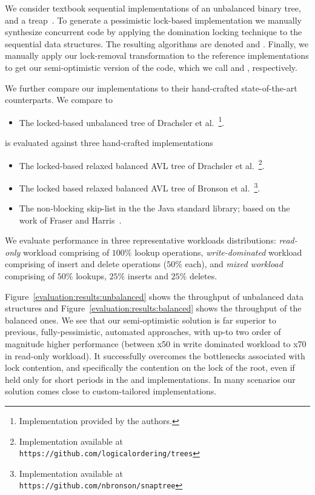 We consider textbook sequential implementations of an unbalanced binary
tree, and a treap~\cite{AragonS1989}. To
generate a pessimistic lock-based implementation we manually synthesize
concurrent code by applying the domination locking technique to the sequential
data structures. The resulting algorithms are denoted \domTree and \domTreap.
Finally, we manually apply our lock-removal transformation to the reference
implementations to get our semi-optimistic version of the code, which we call
\autoTree and \autoTreap, respectively.     

We further compare our implementations to their hand-crafted state-of-the-art counterparts. We compare \autoTree to
\begin{itemize}
\item \danaTree The locked-based 
				unbalanced tree of Drachsler et
				al.~\cite{DrachslerVY2014}\footnote{Implementation provided by the authors.}.
\end{itemize}
\autoTreap is evaluated against three hand-crafted implementations
\begin{itemize}
\item \danaAVL The locked-based relaxed balanced AVL tree of 
				Drachsler et al.~\cite{DrachslerVY2014}\footnote{Implementation available at \\
				\texttt{https://github.com/logicalordering/trees}}.
\item \bronson The locked based relaxed balanced AVL tree
				of Bronson et al.~\cite{BronsonCCO2010}\footnote{Implementation available at \\
				\texttt{https://github.com/nbronson/snaptree}}.
\item \skiplist The non-blocking skip-list in the 
				the Java standard library; based on the work of
				Fraser and Harris~\cite{fraser2004practical}.
\end{itemize}

We evaluate performance in three representative workloads distributions:
\emph{read-only} workload comprising of $100\%$ lookup operations, \emph{write-dominated}
workload comprising of insert and delete operations ($50\%$ each), and
\emph{mixed workload} comprising of $50\%$ lookups, $25\%$ inserts and $25\%$
deletes.

Figure~\ref{evaluation:results:unbalanced} 
shows the throughput of unbalanced data structures and Figure~\ref{evaluation:results:balanced} shows
the throughput of the balanced ones. We see that our semi-optimistic
solution is far superior to previous, fully-pessimistic, 
automated approaches, with up-to two order of magnitude higher performance
(between x50 in write dominated workload to x70 in read-only workload). It
successfully overcomes the bottlenecks associated with lock contention, and 
specifically the contention on the lock of the root, even if held only for short
periods in the \domTree and \domTreap implementations. In
many scenarios our solution comes close to custom-tailored implementations. 

